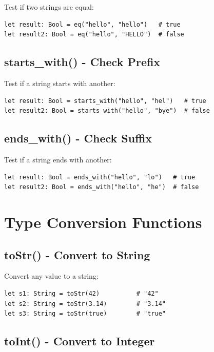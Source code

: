 \documentclass[11pt,twoside,openright]{book}
\begin{document}
Test if two strings are equal:

\begin{lstlisting}[language=ConstructLang]
let result: Bool = eq("hello", "hello")   # true
let result2: Bool = eq("hello", "HELLO")  # false
\end{lstlisting}

\subsection{starts\_with() - Check Prefix}

Test if a string starts with another:

\begin{lstlisting}[language=ConstructLang]
let result: Bool = starts_with("hello", "hel")   # true
let result2: Bool = starts_with("hello", "bye")  # false
\end{lstlisting}

\subsection{ends\_with() - Check Suffix}

Test if a string ends with another:

\begin{lstlisting}[language=ConstructLang]
let result: Bool = ends_with("hello", "lo")   # true
let result2: Bool = ends_with("hello", "he")  # false
\end{lstlisting}

\section{Type Conversion Functions}

\subsection{toStr() - Convert to String}

Convert any value to a string:

\begin{lstlisting}[language=ConstructLang]
let s1: String = toStr(42)          # "42"
let s2: String = toStr(3.14)        # "3.14"
let s3: String = toStr(true)        # "true"
\end{lstlisting}

\subsection{toInt() - Convert to Integer}
\end{document}
